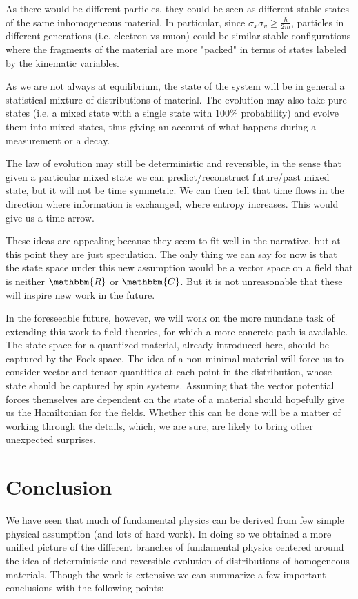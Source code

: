 \documentclass[aps,pra,10pt,twocolumn,floatfix,nofootinbib]{revtex4-1}
\numberwithin{equation}{section}
\theoremstyle{definition}
\begin{document}
As there would be different particles, they could be seen as different stable states of the same inhomogeneous material. In particular, since $\sigma_x \sigma_v \geq \frac{\hbar}{2m}$, particles in different generations (i.e. electron vs muon) could be similar stable configurations where the fragments of the material are more "packed" in terms of states labeled by the kinematic variables.

As we are not always at equilibrium, the state of the system will be in general a statistical mixture of distributions of material. The evolution may also take pure states (i.e. a mixed state with a single state with $100\%$ probability) and evolve them into mixed states, thus giving an account of what happens during a measurement or a decay.

The law of evolution may still be deterministic and reversible, in the sense that given a particular mixed state we can predict/reconstruct future/past mixed state, but it will not be time symmetric.  We can then tell that time flows in the direction where information is exchanged, where entropy increases. This would give us a time arrow.

These ideas are appealing because they seem to fit well in the narrative, but at this point they are just speculation. The only thing we can say for now is that the state space under this new assumption would be a vector space on a field that is neither $\mathbbm{R}$ or $\mathbbm{C}$. But it is not unreasonable that these will inspire new work in the future.

In the foreseeable future, however, we will work on the more mundane task of extending this work to field theories, for which a more concrete path is available. The state space for a quantized material, already introduced here, should be captured by the Fock space. The idea of a non-minimal material will force us to consider vector and tensor quantities at each point in the distribution, whose state should be captured by spin systems. Assuming that the vector potential forces themselves are dependent on the state of a material should hopefully give us the Hamiltonian for the fields. Whether this can be done will be a matter of working through the details, which, we are sure, are likely to bring other unexpected surprises.

\section{Conclusion}

We have seen that much of fundamental physics can be derived from few simple physical assumption (and lots of hard work). In doing so we obtained a more unified picture of the different branches of fundamental physics centered around the idea of deterministic and reversible evolution of distributions of homogeneous materials. Though the work is extensive we can summarize a few important conclusions with the following points:
\end{document}
